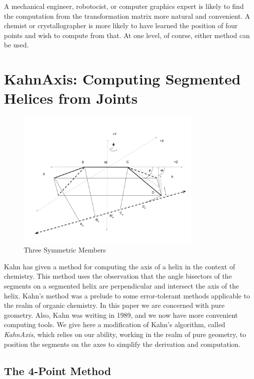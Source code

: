 \documentclass[11pt]{article}
\begin{document}
{A mechanical engineer, robotocist, or computer graphics expert is likely to find the computation from the
transformation matrix more natural and convenient. A chemist or crystallographer is more likely to
have learned the position of four points and wish to compute from that. At one level, of course,
either method can be used.

\section{KahnAxis: Computing Segmented Helices from Joints}

\begin{figure}
     \centering
     \includegraphics[width=0.80\textwidth]{figures/TwoAngleDiagram.png}
     \caption{Three Symmetric Members}
  \label{fig:threemembersdiagram}
\end{figure}

Kahn\cite{kahn1989defining} has given a method for computing the axis of a helix in the context of chemistry.
This method uses the observation that the angle bisectors of the segments on a segmented helix are perpendicular
and intersect the axis of the helix. Kahn's method was a prelude to some error-tolerant methods applicable to
the realm of organic chemistry. In this paper we are concerned with pure geometry. Also, Kahn was writing in 1989,
and we now have more convenient computing tools. We give here a modification of Kahn's algorithm, called {\em KahnAxis},
which relies on our ability, working in the realm of pure geometry, to position the segments on the axes
to simplify the derivation and computation.

\subsection{The 4-Point Method}

}
\end{document}
